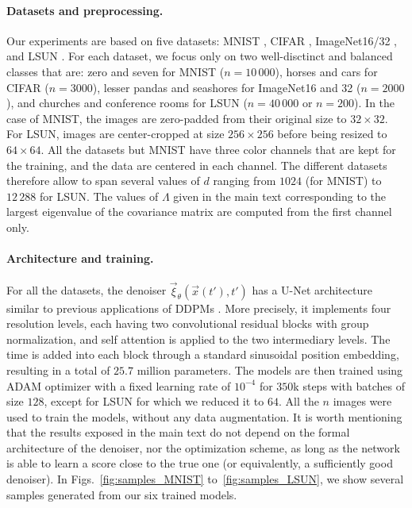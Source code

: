 \documentclass[10pt,twocolumn]{article}
\begin{document}
\paragraph*{Datasets and preprocessing.}
Our experiments are based on five datasets: MNIST \cite{Lecun1998}, CIFAR \cite{Krizhevsky2009_CIFAR}, ImageNet16/32 \cite{Chrabaszcz2017_Imagenet_downsampled}, and LSUN \cite{Yu2015_LSUN}. For each dataset, we focus only on two well-disctinct and balanced classes that are: zero and seven for MNIST ($n=10\,000$), horses and cars for CIFAR ($n=3000$), lesser pandas and seashores for ImageNet16 and 32 ($n=2000$), and churches and conference rooms for LSUN ($n=40\,000$ or $n=200$). In the case of MNIST, the images are zero-padded from their original size to $32\times 32$. For LSUN, images are center-cropped at size $256\times 256$ before being resized to $64\times 64$. All the datasets but MNIST have three color channels that are kept for the training, and the data are centered in each channel. The different datasets therefore allow to span several values of $d$ ranging from $1024$ (for MNIST) to $12\,288$ for LSUN. The values of $\Lambda$ given in the main text corresponding to the largest eigenvalue of the covariance matrix are computed from the first channel only. \\

\paragraph*{Architecture and training.} For all the datasets, the denoiser $\vec \xi_\theta\left(\vec x(t'), t'\right)$ has a U-Net architecture similar to previous applications of DDPMs \cite{Ho2020, song2020denoising}. More precisely, it implements four resolution levels, each having two convolutional residual blocks with group normalization, and self attention is applied to the two intermediary levels. The time is added into each block through a standard sinusoidal position embedding, resulting in a total of $25.7$ million parameters. The models are then trained using ADAM optimizer with a fixed learning rate of $10^{-4}$ for $350$k steps with batches of size $128$, except for LSUN for which we reduced it to $64$. All the $n$ images were used to train the models, without any data augmentation.
It is worth mentioning that the results exposed in the main text do not depend on the formal architecture of the denoiser, nor the optimization scheme, as long as the network is able to learn a score close to the true one (or equivalently, a sufficiently good denoiser). In Figs.~\ref{fig:samples_MNIST} to~\ref{fig:samples_LSUN}, we show several samples generated from our six trained models. \\
\end{document}
